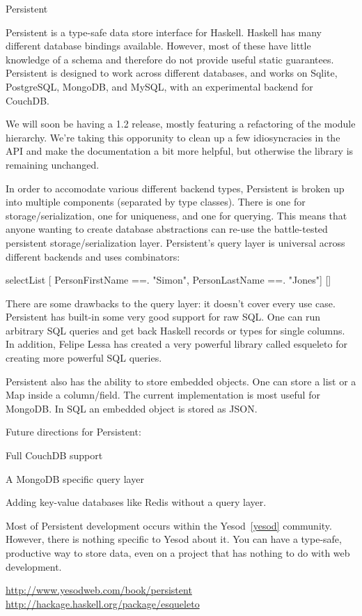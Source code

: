 \begin{hcarentry}{Persistent} 
\label{persistent}
\makeheader

Persistent is a type-safe data store interface for Haskell.
Haskell has many different database bindings available. However, most
of these have little knowledge of a schema and therefore do not provide
useful static guarantees. Persistent is designed to work across different databases, and works on Sqlite, PostgreSQL, MongoDB, and MySQL, with an experimental backend for CouchDB.

We will soon be having a 1.2 release, mostly featuring a refactoring of the module hierarchy. We're taking this opporunity to clean up a few idiosyncracies in the API and make the documentation a bit more helpful, but otherwise the library is remaining unchanged.

In order to accomodate various different backend types, Persistent is broken up into multiple components (separated by type classes). There is one for storage/serialization, one for uniqueness, and one for querying. This means that anyone wanting to create database abstractions can re-use the battle-tested persistent storage/serialization layer. Persistent's query layer is universal across different backends and uses combinators:

\begin{code}
selectList [  PersonFirstName ==. "Simon", 
              PersonLastName ==. "Jones"] []
\end{code}

There are some drawbacks to the query layer: it doesn't cover every use case. Persistent has built-in some very good support for raw SQL. One can run arbitrary SQL queries and get back Haskell records or types for single columns. In addition, Felipe Lessa has created a very powerful library called esqueleto for creating more powerful SQL queries.

Persistent also has the ability to store embedded objects. One can store a list or a Map inside a column/field. The current implementation is most useful for MongoDB. In SQL an embedded object is stored as JSON.

\FuturePlans 
Future directions for Persistent:
\begin{compactitem}
\item Full CouchDB support
\item A MongoDB specific query layer
\item Adding key-value databases like Redis without a query layer.
\end{compactitem}

Most of Persistent development occurs within the Yesod~\cref{yesod} community.
However, there is nothing specific to Yesod about it.
You can have a type-safe, productive way to store data,
even on a project that has nothing to do with web development.

\FurtherReading 
\url{http://www.yesodweb.com/book/persistent} 
\url{http://hackage.haskell.org/package/esqueleto}
\end{hcarentry}
